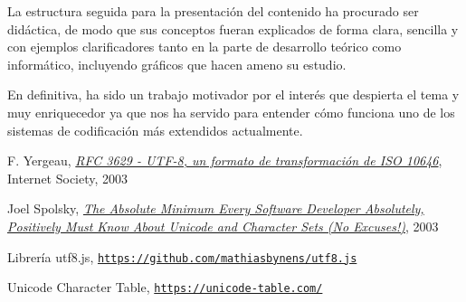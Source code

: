 \documentclass{article}
\begin{document}
La estructura seguida para la presentación del contenido ha procurado ser
didáctica, de modo que sus conceptos fueran explicados de forma clara, sencilla
y con ejemplos clarificadores tanto en la parte de desarrollo teórico como
informático, incluyendo gráficos que hacen ameno su estudio.

En definitiva, ha sido un trabajo motivador por el interés que despierta el tema
y muy enriquecedor ya que nos ha servido para entender cómo funciona uno de los
sistemas de codificación más extendidos actualmente.


\begin{thebibliography}{9}
  F. Yergeau, \href{https://tools.ietf.org/html/rfc3629}{\textit{RFC 3629 -
      UTF-8, un formato de transformación de ISO 10646}}, Internet Society, 2003

  Joel Spolsky,
  \href{https://www.joelonsoftware.com/2003/10/08/the-absolute-minimum-every-software-developer-absolutely-positively-must-know-about-unicode-and-character-sets-no-excuses/}{\textit{The
      Absolute Minimum Every Software Developer Absolutely, Positively Must Know
      About Unicode and Character Sets (No Excuses!)}}, 2003

  Librería utf8.js,
  \href{https://github.com/mathiasbynens/utf8.js}{\texttt{https://github.com/mathiasbynens/utf8.js}}

  Unicode Character Table,
  \href{https://unicode-table.com/}{\texttt{https://unicode-table.com/}}

\end{thebibliography}
\end{document}
